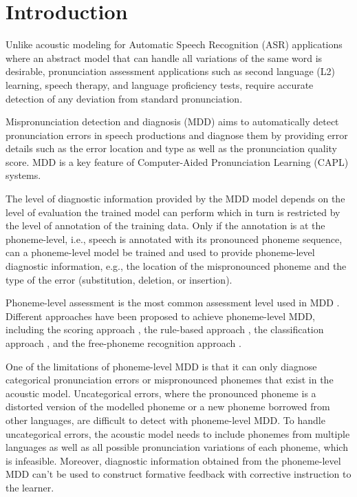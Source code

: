 \documentclass[12pt]{elsarticle}
\begin{document}
\section{Introduction}
\label{sec:intro}
Unlike acoustic modeling for Automatic Speech Recognition (ASR) applications where an abstract model that can handle all variations of the same word is desirable, pronunciation assessment applications such as second language (L2) learning, speech therapy, and language proficiency tests, require accurate detection of any deviation from standard pronunciation.

Mispronunciation detection and diagnosis (MDD) aims to automatically detect pronunciation errors in speech productions and diagnose them by providing error details such as the error location and type as well as the pronunciation quality score.  MDD is a key feature of Computer-Aided Pronunciation Learning (CAPL) systems.

The level of diagnostic information provided by the MDD model depends on the level of evaluation the trained model can perform which in turn is restricted by the level of annotation of the training data. Only if the annotation is at the phoneme-level, i.e., speech is annotated with its pronounced phoneme sequence, can a phoneme-level model be trained and used to provide phoneme-level diagnostic information, e.g., the location of the mispronounced phoneme and the type of the error (substitution, deletion, or insertion).

Phoneme-level assessment is the most common assessment level used in MDD \cite{RN30,RN31,RN37,RN41,RN42,RN43,RN44,RN45}. Different approaches have been proposed to achieve phoneme-level MDD, including the scoring approach \cite{RN43, RN112, RN113, RN114, RN115, RN116, RN117, RN118}, the rule-based approach \cite{RN33, RN34, RN42, RN37}, the classification approach \cite{RN120, RN121, RN122, RN123, RN124, RN125, RN126, RN127, RN46}, and the free-phoneme recognition approach \cite{RN32, RN95, RN132, RN133}.

One of the limitations of phoneme-level MDD is that it can only diagnose categorical pronunciation errors or mispronounced phonemes that exist in the acoustic model. Uncategorical errors, where the pronounced phoneme is a distorted version of the modelled phoneme or a new phoneme borrowed from other languages, are difficult to detect with phoneme-level MDD. To handle uncategorical errors, the acoustic model needs to include phonemes from multiple languages as well as all possible pronunciation variations of each phoneme, which is infeasible. Moreover, diagnostic information obtained from the phoneme-level MDD can't be used to construct formative feedback with corrective instruction to the learner.
\end{document}
